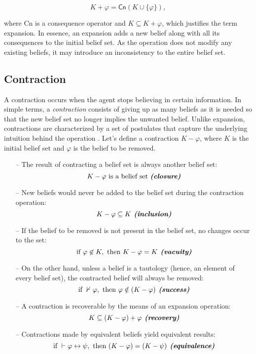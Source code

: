 $$K + \varphi = \textsf{Cn}(K \cup \{ \varphi \}),$$

where \textsf{Cn} is a consequence operator and $K \subseteq K + \varphi$, which justifies the term expansion. In essence, an expansion adds a new belief along with all its consequences to the initial belief set. As the operation does not modify any existing beliefs, it may introduce an inconsistency to the entire belief set.

\subsection{Contraction}
\label{subsec:contraction}

A contraction occurs when the agent stops believing in certain information. In simple terms, a \textit{contraction} consists of giving up as many beliefs as it is needed so that the new belief set no longer implies the unwanted belief. Unlike expansion, contractions are characterized by a set of postulates that capture the underlying intuition behind the operation \citep{Wassermann2000}. Let's define a contraction $K - \varphi$, where $K$ is the initial belief set and $\varphi$ is the belief to be removed.

\begin{enumerate}
    \item[--] The result of contracting a belief set is always another belief set:    
    $$K - \varphi \text{ is a belief set \textbf{\textit{(closure)}}}$$

    \item[--] New beliefs would never be added to the belief set during the contraction operation:    
    $$K - \varphi \subseteq K \textbf{\textit{ (inclusion)}}$$

    \item[--] If the belief to be removed is not present in the belief set, no changes occur to the set:
    $$\text{if } \varphi \not \in K, \text{ then } K - \varphi = K \textbf{\textit{ (vacuity)}}$$

    \item[--] On the other hand, unless a belief is a tautology (hence, an element of every belief set), the contracted belief will always be removed:
    $$\text{if } \nvdash \varphi, \textrm{ then } \varphi \notin (K - \varphi) \textbf{\textit{ (success)}}$$
    
    \item[--] A contraction is recoverable by the means of an expansion operation:
    $$K \subseteq (K - \varphi) + \varphi \textbf{\textit{ (recovery)}}$$
    
    \item[--] Contractions made by equivalent beliefs yield equivalent results:
    $$\text{if } \vdash \varphi \leftrightarrow \psi, \text{ then } (K - \varphi) = (K - \psi) \textbf{\textit{ (equivalence)}}$$
\end{enumerate}

